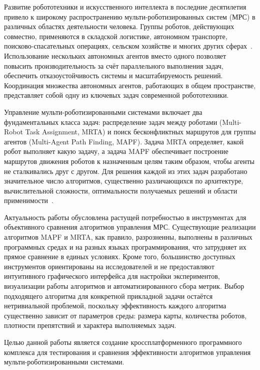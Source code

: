 \introduction

Развитие робототехники и искусственного интеллекта в последние десятилетия привело к широкому распространению мульти-роботизированных систем (МРС) в различных областях деятельности человека. Группы роботов, действующих совместно, применяются в складской логистике, автономном транспорте, поисково-спасательных операциях, сельском хозяйстве и многих других сферах~\cite{wurman2008kiva, parker2008mrs}. Использование нескольких автономных агентов вместо одного позволяет повысить производительность за счёт параллельного выполнения задач, обеспечить отказоустойчивость системы и масштабируемость решений. Координация множества автономных агентов, работающих в общем пространстве, представляет собой одну из ключевых задач современной робототехники.

Управление мульти-роботизированными системами включает два фундаментальных класса задач: распределение задач между роботами (Multi-Robot Task Assignment, MRTA) и поиск бесконфликтных маршрутов для группы агентов (Multi-Agent Path Finding, MAPF). Задача MRTA определяет, какой робот выполняет какую задачу, а задача MAPF обеспечивает построение маршрутов движения роботов к назначенным целям таким образом, чтобы агенты не сталкивались друг с другом. Для решения каждой из этих задач разработано значительное число алгоритмов, существенно различающихся по архитектуре, вычислительной сложности, оптимальности получаемых решений и области применимости~\cite{stern2019mapf, gerkey2004taxonomy}.

Актуальность работы обусловлена растущей потребностью в инструментах для объективного сравнения алгоритмов управления МРС. Существующие реализации алгоритмов MAPF и MRTA, как правило, разрозненны, выполнены в различных программных средах и на разных языках программирования, что затрудняет их прямое сравнение в единых условиях. Кроме того, большинство доступных инструментов ориентированы на исследователей и не предоставляют интуитивного графического интерфейса для настройки экспериментов, визуализации работы алгоритмов и автоматизированного сбора метрик. Выбор подходящего алгоритма для конкретной прикладной задачи остаётся нетривиальной проблемой, поскольку эффективность каждого алгоритма существенно зависит от параметров среды: размера карты, количества роботов, плотности препятствий и характера выполняемых задач.

Целью данной работы является создание кроссплатформенного программного комплекса для тестирования и сравнения эффективности алгоритмов управления мульти-роботизированными системами.

